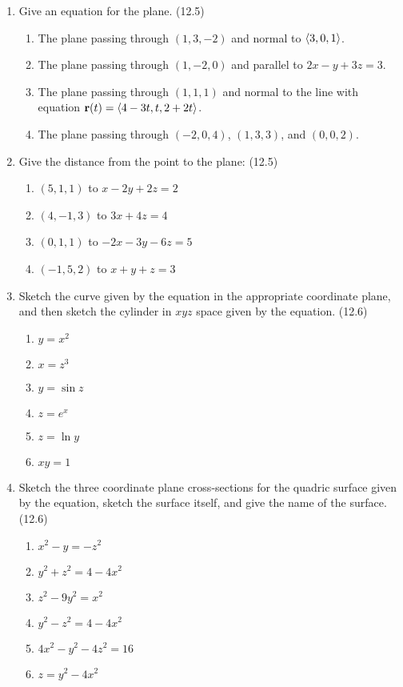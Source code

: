 \begin{enumerate}
    \newpage

    \item Give an equation for the plane. (12.5)

      \begin{enumerate}
        \item The plane passing through $(1,3,-2)$ and normal to $\left<3,0,1\right>$.
        \item The plane passing through $(1,-2,0)$ and parallel to $2x-y+3z=3$.
        \item The plane passing through $(1,1,1)$ and normal to the line with equation $\mathbf{r}(t)=\left<4-3t,t,2+2t\right>$.
        \item The plane passing through $(-2,0,4)$, $(1,3,3)$, and $(0,0,2)$.
      \end{enumerate}

    \item Give the distance from the point to the plane: (12.5) %

      \begin{enumerate}
        \item $(5,1,1)$ to $x-2y+2z=2$
        \item $(4,-1,3)$ to $3x+4z=4$
        \item $(0,1,1)$ to $-2x-3y-6z=5$
        \item $(-1,5,2)$ to $x+y+z=3$
      \end{enumerate}

    \item Sketch the curve given by the equation in the appropriate coordinate plane, and then sketch the cylinder in $xyz$ space given by the equation. (12.6)

      \begin{enumerate}
        \item $y=x^2$
        \item $x=z^3$
        \item $y=\sin z$
        \item $z=e^x$
        \item $z=\ln y$
        \item $xy=1$
      \end{enumerate}

    \item Sketch the three coordinate plane cross-sections for the quadric surface given by the equation, sketch the surface itself, and give the name of the surface. (12.6)

      \begin{enumerate}
        \item $x^2-y=-z^2$
        \item $y^2+z^2=4-4x^2$
        \item $z^2-9y^2=x^2$
        \item $y^2-z^2=4-4x^2$
        \item $4x^2-y^2-4z^2=16$
        \item $z=y^2-4x^2$
      \end{enumerate}


\end{enumerate}
